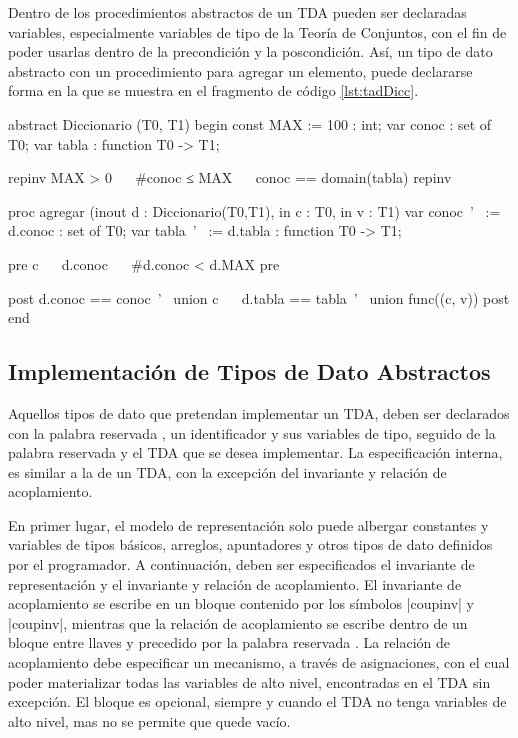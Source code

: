 Dentro de los procedimientos abstractos de un TDA pueden ser declaradas
variables, especialmente variables de tipo de la Teoría de Conjuntos, con el
fin de poder usarlas dentro de la precondición y la poscondición. Así, un tipo
de dato abstracto  con un procedimiento para agregar un
elemento, puede declararse forma en la que se muestra en el fragmento de código
\ref{lst:tadDicc}.

\begin{widegracielacode}[caption=TAD Diccionario, label=lst:tadDicc]
abstract Diccionario (T0, T1) begin
  const MAX := 100 : int;
  var   conoc      : set of T0;
  var   tabla      : function T0 -> T1;

  {repinv MAX > 0 ~\Land~ #conoc ≤ MAX ~\Land~ conoc == domain(tabla) repinv}

  proc agregar (inout d : Diccionario(T0,T1), in c : T0, in v : T1)
    var conoc~'~ := d.conoc : set of T0;
    var tabla~'~ := d.tabla : function T0 -> T1;

    {pre c ~\Notelem~ d.conoc ~\Land~ #d.conoc < d.MAX pre}

    {post  d.conoc == conoc~'~ union {c}
         ~\Land~ d.tabla == tabla~'~ union func({(c, v)}) post}
end
\end{widegracielacode}

\subsection{Implementación de Tipos de Dato Abstractos}

Aquellos tipos de dato que pretendan implementar un TDA, deben ser declarados
con la palabra reservada , un identificador y sus variables de
tipo, seguido de la palabra reservada  y el TDA que se
desea implementar. La especificación interna, es similar a la de un TDA, con la
excepción del invariante y relación de acoplamiento.

En primer lugar, el modelo de representación solo puede albergar constantes y
variables de tipos básicos, arreglos, apuntadores y otros tipos de dato
definidos por el programador. A continuación, deben ser especificados el
invariante de representación y el invariante y relación de acoplamiento. El
invariante de acoplamiento se escribe en un bloque contenido por los símbolos
\ingra|{coupinv| y \ingra|coupinv}|, mientras que la relación de
acoplamiento se escribe dentro de un bloque entre llaves y precedido por la
palabra reservada . La relación de acoplamiento debe especificar
un mecanismo, a través de asignaciones, con el cual poder materializar todas
las variables de alto nivel, encontradas en el TDA sin excepción. El bloque
 es opcional, siempre y cuando el TDA no tenga variables de alto
nivel, mas no se permite que quede vacío.

